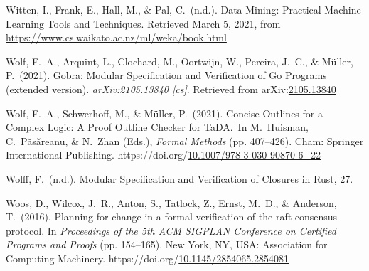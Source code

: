 \documentclass[12pt,twoside]{article}
\begin{document}
{\begin{thebibliography}{1079}
\mdbibitemlabel{}Witten, I., Frank, E., Hall, M., \& Pal, C.~(n.d.). Data Mining: Practical Machine Learning Tools and Techniques. Retrieved March 5, 2021, from \href{https://www.cs.waikato.ac.nz/ml/weka/book.html}{{\ttfamily https://\hspace{0pt}www.\hspace{0pt}cs.\hspace{0pt}waikato.\hspace{0pt}ac.\hspace{0pt}nz/\hspace{0pt}ml/\hspace{0pt}weka/\hspace{0pt}book.\hspace{0pt}html}}%

\mdbibitemlabel{}Wolf, F.~A., Arquint, L., Clochard, M., Oortwijn, W., Pereira, J.~C., \& Müller, P.~(2021). Gobra: Modular Specification and Verification of Go Programs (extended version). \emph{arXiv:2105.13840 {}[cs]}. Retrieved from arXiv:\href{http://arxiv.org/abs/2105.13840}{2105.13840}%

\mdbibitemlabel{}Wolf, F.~A., Schwerhoff, M., \& Müller, P.~(2021). Concise Outlines for a Complex Logic: A Proof Outline Checker for TaDA.~In M.~Huisman, C.~Păsăreanu, \& N.~Zhan (Eds.), \emph{Formal Methods} (pp. 407–426). Cham: Springer International Publishing. https://doi.org/\href{https://dx.doi.org/10.1007/978-3-030-90870-6_22}{10.1007/978-3-030-90870-6\_22}%

\mdbibitemlabel{}Wolff, F.~(n.d.). Modular Specification and Verification of Closures in Rust, 27.%

\mdbibitemlabel{}Woos, D., Wilcox, J.~R., Anton, S., Tatlock, Z., Ernst, M.~D., \& Anderson, T.~(2016). Planning for change in a formal verification of the raft consensus protocol. In \emph{Proceedings of the 5th ACM SIGPLAN Conference on Certified Programs and Proofs} (pp. 154–165). New York, NY, USA: Association for Computing Machinery. https://doi.org/\href{https://dx.doi.org/10.1145/2854065.2854081}{10.1145/2854065.2854081}%


\end{thebibliography}}
\end{document}

